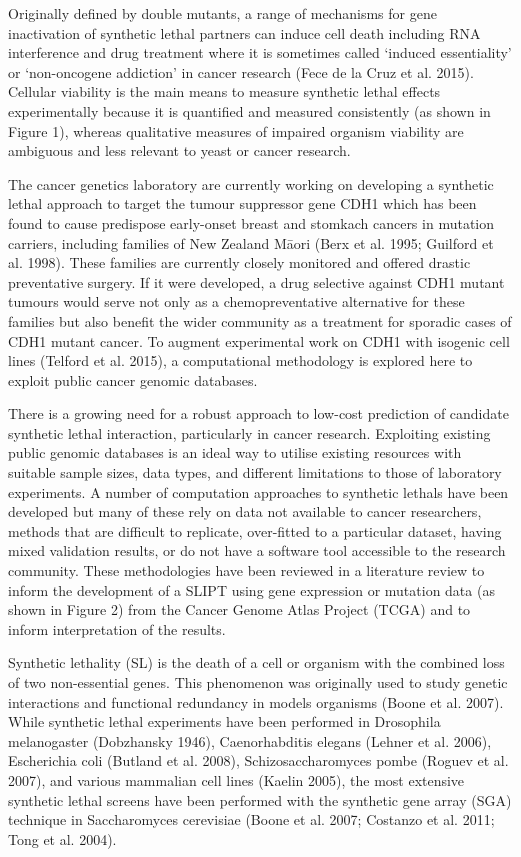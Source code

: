Originally defined by double mutants, a range of mechanisms for gene inactivation of \gls{synthetic lethal} partners can induce cell death including \gls{RNA} interference and drug treatment where it is sometimes called ‘induced essentiality’ or ‘non-oncogene addiction’ in cancer research (Fece de la Cruz et al. 2015).  Cellular viability is the main means to measure \gls{synthetic lethal} effects experimentally because it is quantified and measured consistently (as shown in Figure 1), whereas qualitative measures of impaired organism viability are ambiguous and less relevant to yeast or cancer research.

The cancer genetics laboratory are currently working on developing a \gls{synthetic lethal} approach to target the tumour suppressor gene CDH1 which has been found to cause predispose early-onset breast and stomkach cancers in mutation carriers, including families of New Zealand M\={a}ori (Berx et al. 1995; Guilford et al. 1998).  These families are currently closely monitored and offered drastic preventative surgery.  If it were developed, a drug selective against CDH1 mutant tumours would serve not only as a chemopreventative alternative for these families but also benefit the wider community as a treatment for sporadic cases of CDH1 mutant cancer.  To augment experimental work on CDH1 with isogenic cell lines (Telford et al. 2015), a computational methodology is explored here to exploit public cancer genomic databases.

There is a growing need for a robust approach to low-cost prediction of candidate \gls{synthetic lethal} interaction, particularly in cancer research.  Exploiting existing public genomic databases is an ideal way to utilise existing resources with suitable sample sizes, data types, and different limitations to those of laboratory experiments.  A number of computation approaches to \glspl{synthetic lethal} have been developed but many of these rely on data not available to cancer researchers, methods that are difficult to replicate, over-fitted to a particular dataset, having mixed validation results, or do not have a software tool accessible to the research community.  These methodologies have been reviewed in a literature review to inform the development of a \gls{SLIPT} using gene expression or mutation data (as shown in Figure 2) from the Cancer Genome Atlas Project (\gls{TCGA}) and to inform interpretation of the results.  

Synthetic lethality (SL) is the death of a cell or organism with the combined loss of two non-essential genes.   This phenomenon was originally used to study genetic interactions and functional redundancy in models organisms (Boone et al. 2007).   While synthetic lethal experiments have been performed in Drosophila melanogaster (Dobzhansky 1946), Caenorhabditis elegans (Lehner et al. 2006), Escherichia coli (Butland et al. 2008), Schizosaccharomyces pombe (Roguev et al. 2007), and various mammalian cell lines (Kaelin 2005), the most extensive synthetic lethal screens have been performed with the synthetic gene array (SGA) technique in Saccharomyces cerevisiae (Boone et al. 2007; Costanzo et al. 2011; Tong et al. 2004).  

